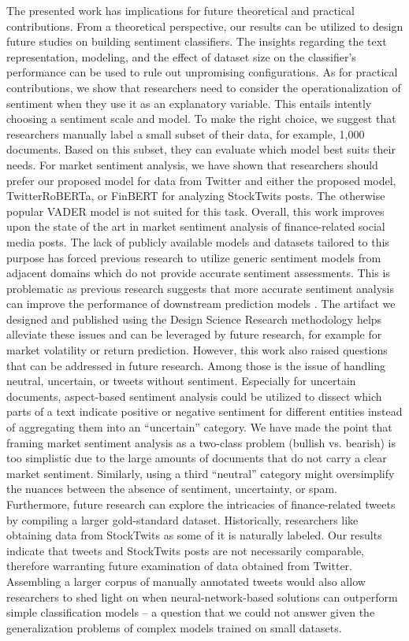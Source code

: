 The presented work has implications for future theoretical and practical contributions. From a theoretical perspective, our results can be utilized to design future studies on building sentiment classifiers. The insights regarding the text representation, modeling, and the effect of dataset size on the classifier's performance can be used to rule out unpromising configurations.
 As for practical contributions, we show that researchers need to consider the operationalization of sentiment when they use it as an explanatory variable. This entails intently choosing a sentiment scale and model. To make the right choice, we suggest that researchers manually label a small subset of their data, for example, 1,000 documents. Based on this subset, they can evaluate which model best suits their needs. For market sentiment analysis, we have shown that researchers should prefer our proposed model for data from Twitter and either the proposed model, TwitterRoBERTa, or FinBERT for analyzing StockTwits posts. The otherwise popular VADER model is not suited for this task.\newline
Overall, this work improves upon the state of the art in market sentiment analysis of finance-related social media posts. The lack of publicly available models and datasets tailored to this purpose has forced previous research to utilize generic sentiment models from adjacent domains which do not provide accurate sentiment assessments. This is problematic as previous research suggests that more accurate sentiment analysis can improve the performance of downstream prediction models . The artifact we designed and published using the Design Science Research methodology helps alleviate these issues and can be leveraged by future research, for example for market volatility or return prediction.\newline
However, this work also raised questions that can be addressed in future research. Among those is the issue of handling neutral, uncertain, or tweets without sentiment. Especially for uncertain documents, aspect-based sentiment analysis could be utilized to dissect which parts of a text indicate positive or negative sentiment for different entities instead of aggregating them into an ``uncertain'' category. We have made the point that framing market sentiment analysis as a two-class problem (bullish vs. bearish) is too simplistic due to the large amounts of documents that do not carry a clear market sentiment. Similarly, using a third ``neutral'' category might oversimplify the nuances between the absence of sentiment, uncertainty, or spam.
Furthermore, future research can explore the intricacies of finance-related tweets by compiling a larger gold-standard dataset. Historically, researchers like obtaining data from StockTwits as some of it is naturally labeled. Our results indicate that tweets and StockTwits posts are not necessarily comparable, therefore warranting future examination of data obtained from Twitter. Assembling a larger corpus of manually annotated tweets would also allow researchers to shed light on when neural-network-based solutions can outperform simple classification models -- a question that we could not answer given the generalization problems of complex models trained on small datasets.

